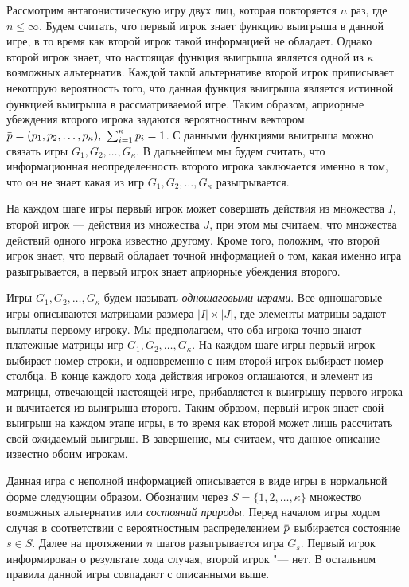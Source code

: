 Рассмотрим антагонистическую игру двух лиц, которая повторяется $n$ раз, где $n\leq \infty$.
Будем считать, что первый игрок знает функцию выигрыша в данной игре, в то время как второй игрок такой информацией не обладает.
Однако второй игрок знает, что настоящая функция выигрыша является одной из $\kappa$ возможных альтернатив.
Каждой такой альтернативе второй игрок приписывает некоторую вероятность того, что данная функция выигрыша является истинной функцией выигрыша в рассматриваемой
игре.
Таким образом, априорные убеждения второго игрока задаются вероятностным вектором
$\p = (p_1, p_2, \ldots, p_\kappa),\ \sum_{i=1}^\kappa p_i = 1$.
С данными функциями выигрыша можно связать игры $G_1, G_2, \ldots, G_\kappa$.
В дальнейшем мы будем считать, что информационная неопределенность второго игрока заключается именно в том, что он не знает какая из игр $G_1, G_2, \ldots, G_\kappa$ разыгрывается.

На каждом шаге игры первый игрок может совершать действия из множества $I$, второй игрок --- действия из множества $J$, при этом мы считаем, что множества действий одного игрока известно другому.
Кроме того, положим, что второй игрок знает, что первый обладает точной информацией о том, какая именно игра разыгрывается, а первый игрок знает априорные убеждения второго.

Игры $G_1, G_2, \ldots, G_\kappa$ будем называть \emph{одношаговыми играми}.
Все одношаговые игры описываются матрицами размера $|I| \times |J|$, где элементы матрицы задают выплаты первому игроку.
Мы предполагаем, что оба игрока точно знают платежные матрицы игр $G_1, G_2, \ldots, G_\kappa$.
На каждом шаге игры первый игрок выбирает номер строки, и одновременно с ним второй игрок выбирает номер столбца.
В конце каждого хода действия игроков оглашаются, и элемент из матрицы, отвечающей настоящей игре, прибавляется к выигрышу первого игрока и вычитается из выигрыша второго.
Таким образом, первый игрок знает свой выигрыш на каждом этапе игры, в то время как второй может лишь рассчитать свой ожидаемый выигрыш.
В завершение, мы считаем, что данное описание известно обоим игрокам.

Данная игра с неполной информацией описывается в виде игры в нормальной форме следующим образом.
Обозначим через $S = \{1, 2, \ldots, \kappa\}$ множество возможных альтернатив или \emph{состояний природы}.
Перед началом игры ходом случая в соответствии с вероятностным распределением $\p$ выбирается состояние $s \in S$.
Далее на протяжении $n$ шагов разыгрывается игра $G_s$.
Первый игрок информирован о результате хода случая, второй игрок "--- нет.
В остальном правила данной игры совпадают с описанными выше.

